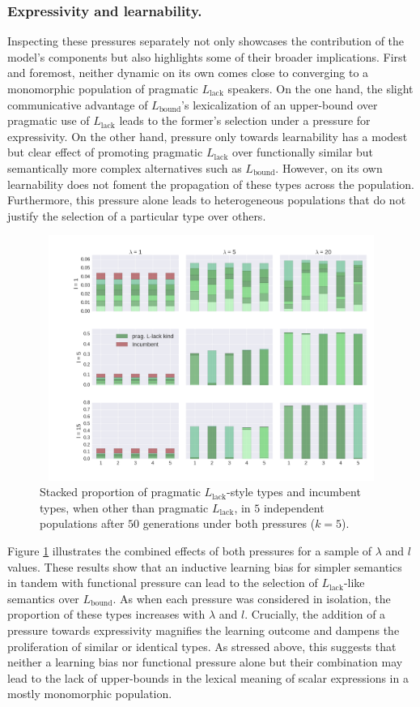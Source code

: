\documentclass[a4paper]{article}
\newcommand{\mylang}[1]{\ensuremath{L_{\text{#1}}}\xspace} %
\newcommand{\Lbound}{\mylang{bound}}
\newcommand{\Llack}{\mylang{lack}}
\begin{document}
\subsubsection{Expressivity and learnability.}
Inspecting these pressures separately not only showcases the contribution of the model's components but also highlights some of their broader implications. First and foremost, neither dynamic on its own comes close to converging to a monomorphic population of pragmatic $\Llack$ speakers. On the one hand, the slight communicative advantage of $\Lbound$'s lexicalization of an upper-bound over pragmatic use of $\Llack$ leads to the former's selection under a pressure for expressivity. On the other hand, pressure only towards learnability has a modest but clear effect of promoting pragmatic $\Llack$ over functionally similar but semantically more complex alternatives such as $\Lbound$. However, on its own learnability does not foment the propagation of these types across the population. Furthermore, this pressure alone leads to heterogeneous populations that do not justify the selection of a particular type over others.

\begin{figure}
\centering
\includegraphics[width=1\textwidth,height=8cm,keepaspectratio]{./plots/fig3-r+m}
\caption{Stacked proportion of pragmatic $\Llack$-style types and incumbent types, when other than pragmatic $\Llack$, in $5$ independent populations after $50$ generations under both pressures ($k = 5$).}
\label{fig:rmd}
\end{figure}

Figure \ref{fig:rmd} illustrates the combined effects of both pressures for a sample of $\lambda$ and $l$ values. These results show that an inductive learning bias for simpler semantics in tandem with functional pressure can lead to the selection of $\Llack$-like semantics over $\Lbound$. As when each pressure was considered in isolation, the proportion of these types increases with $\lambda$ and $l$. Crucially, the addition of a pressure towards expressivity magnifies the learning outcome and dampens the proliferation of similar or identical types. As stressed above, this suggests that neither a learning bias nor functional pressure alone but their combination may lead to the lack of upper-bounds in the lexical meaning of scalar expressions in a mostly monomorphic population. 
\end{document}
